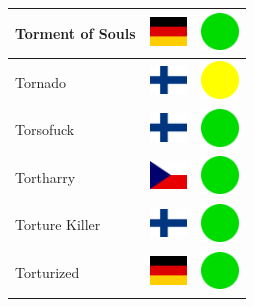 \documentclass[12pt, a4paper, twoside]{report}
\begin{document}
\begin{center}
\begin{longtable}{|p{5cm}|p{2cm}|p{2cm}|}
Torment of Souls & \includegraphics[width=1cm]{4x3/de} & \includegraphics[width=1cm]{likes/y} \\ \hline
Tornado & \includegraphics[width=1cm]{4x3/fi} & \includegraphics[width=1cm]{likes/m} \\ \hline
Torsofuck & \includegraphics[width=1cm]{4x3/fi} & \includegraphics[width=1cm]{likes/y} \\ \hline
Tortharry & \includegraphics[width=1cm]{4x3/cz} & \includegraphics[width=1cm]{likes/y} \\ \hline
Torture Killer & \includegraphics[width=1cm]{4x3/fi} & \includegraphics[width=1cm]{likes/y} \\ \hline
Torturized & \includegraphics[width=1cm]{4x3/de} & \includegraphics[width=1cm]{likes/y} \\ \hline

\end{longtable}
\end{center}
\end{document}
